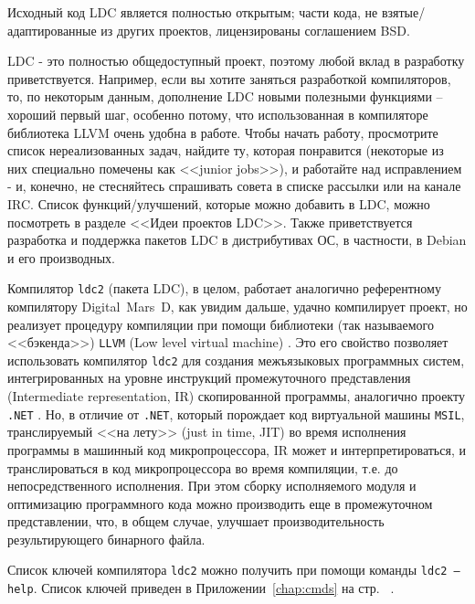 \documentclass[732]{studrep}
\begin{document}
Исходный код LDC является полностью открытым; части кода, не взятые/адаптированные из других проектов, лицензированы соглашением BSD.

LDC - это полностью общедоступный проект, поэтому любой вклад в разработку приветствуется. Например, если вы хотите заняться разработкой компиляторов, то, по некоторым данным, дополнение LDC новыми полезными функциями -- хороший первый шаг, особенно потому, что использованная в компиляторе библиотека LLVM очень удобна в работе. Чтобы начать работу, просмотрите список нереализованных задач, найдите ту, которая понравится (некоторые из них специально помечены как <<junior jobs>>), и работайте над исправлением - и, конечно, не стесняйтесь спрашивать совета в списке рассылки или на канале IRC. Список функций/улучшений, которые можно добавить в LDC, можно посмотреть в разделе <<Идеи проектов LDC>>. Также приветствуется разработка и поддержка пакетов LDC в дистрибутивах ОС, в частности, в Debian и его производных.

Компилятор \texttt{ldc2} (пакета LDC), в целом, работает аналогично референтному компилятору Digital~Mars~D, как увидим дальше, удачно компилирует проект, но реализует процедуру компиляции при помощи библиотеки (так называемого <<бэкенда>>) \texttt{LLVM} (Low level virtual machine) \cite{llvm}.  Это его свойство позволяет использовать компилятор \texttt{ldc2} для создания межъязыковых программных систем, интегрированных на уровне инструкций промежуточного представления (Intermediate representation, IR) скопированной программы, аналогично проекту \texttt{.NET} \cite{dotnet}.  Но, в отличие от \texttt{.NET}, который порождает код виртуальной машины \texttt{MSIL}, транслируемый <<на лету>> (just in time, JIT) во время исполнения программы в машинный код микропроцессора, IR может и интерпретироваться, и транслироваться в код микропроцессора во время компиляции, т.е. до непосредственного исполнения.  При этом сборку исполняемого модуля и оптимизацию программного кода можно производить еще в промежуточном представлении, что, в общем случае, улучшает производительность результирующего бинарного файла.

Список ключей компилятора \texttt{ldc2} можно получить при помощи команды \texttt{ldc2 --help}. Список ключей приведен в Приложении~\ref{chap:cmds} на стр.
~\pageref{chap:cmds}.

\begin{verbatim}

\end{verbatim}
\end{document}
